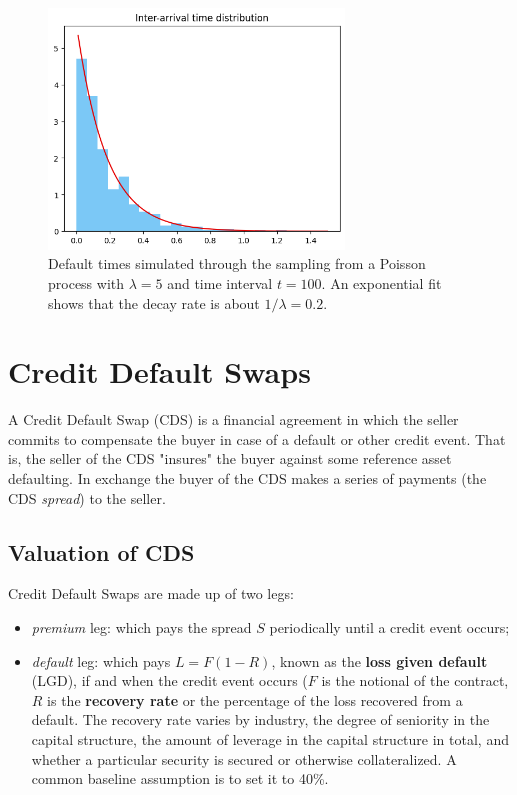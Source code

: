 \begin{figure}[htb]
	\centering
	\includegraphics[width=0.7\textwidth]{figures/default_time_simulation}
	\caption{Default times simulated through the sampling from a Poisson process with $\lambda=5$ and time interval $t=100$. An exponential fit shows that the decay rate is about $1/\lambda=0.2$.}
	\label{fig:default_time_simulation}
\end{figure}


\section{Credit Default Swaps}
\label{sec:credit-default-swaps}


A Credit Default Swap (CDS) is a financial agreement in which the seller commits to compensate the buyer in case of a default or other credit event. That is, the seller of the CDS "insures" the buyer against some reference asset defaulting. In exchange the buyer of the CDS makes a series of payments (the CDS \emph{spread}) to the seller.

\subsection{Valuation of CDS}
\label{sec:cds_valuation}

Credit Default Swaps are made up of two legs:

\begin{itemize}
\tightlist
\item \emph{premium} leg: which pays the spread $S$ periodically until a credit event occurs;
\item \emph{default} leg: which pays $L = F(1 - R)$, known as the \textbf{loss given default} (LGD), if and when the credit event occurs ($F$ is the notional of the contract, $R$ is the \textbf{recovery rate} or the percentage of the loss recovered from a default. The recovery rate varies by industry, the degree of seniority in the capital structure, the amount of leverage in the capital structure in total, and whether a particular security is secured or otherwise collateralized. A common baseline assumption is to set it to 40\%.
\end{itemize}

